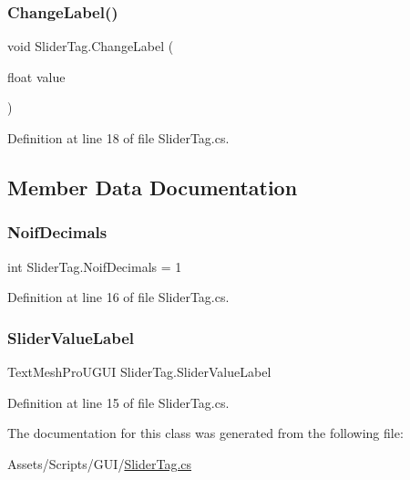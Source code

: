 \subsubsection{\texorpdfstring{Change\+Label()}{ChangeLabel()}}
{\footnotesize\ttfamily void Slider\+Tag.\+Change\+Label (\begin{DoxyParamCaption}\item[{float}]{value }\end{DoxyParamCaption})}



Definition at line 18 of file Slider\+Tag.\+cs.



\subsection{Member Data Documentation}
\mbox{\label{class_slider_tag_aeed31b95a2b1060535ca9adadfc51f41}} 
\subsubsection{\texorpdfstring{Noif\+Decimals}{NoifDecimals}}
{\footnotesize\ttfamily int Slider\+Tag.\+Noif\+Decimals = 1}



Definition at line 16 of file Slider\+Tag.\+cs.

\mbox{\label{class_slider_tag_a6fd7526ecf472c732d82eb66731a6b70}} 
\subsubsection{\texorpdfstring{Slider\+Value\+Label}{SliderValueLabel}}
{\footnotesize\ttfamily Text\+Mesh\+Pro\+U\+G\+UI Slider\+Tag.\+Slider\+Value\+Label}



Definition at line 15 of file Slider\+Tag.\+cs.



The documentation for this class was generated from the following file\+:\begin{DoxyCompactItemize}
\item 
Assets/\+Scripts/\+G\+U\+I/\mbox{\hyperlink{_slider_tag_8cs}{Slider\+Tag.\+cs}}\end{DoxyCompactItemize}
